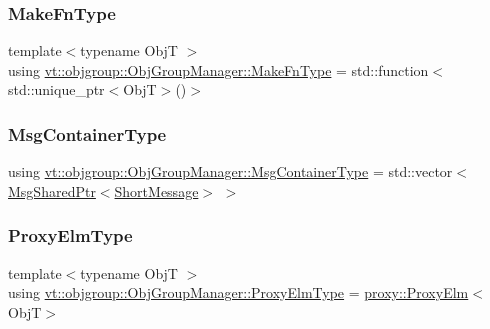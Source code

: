 \mbox{\label{structvt_1_1objgroup_1_1_obj_group_manager_a397d787b3876752a6d70511b2769b872}} 
\subsubsection{\texorpdfstring{Make\+Fn\+Type}{MakeFnType}}
{\footnotesize\ttfamily template$<$typename ObjT $>$ \\
using \hyperlink{structvt_1_1objgroup_1_1_obj_group_manager_a397d787b3876752a6d70511b2769b872}{vt\+::objgroup\+::\+Obj\+Group\+Manager\+::\+Make\+Fn\+Type} =  std\+::function$<$std\+::unique\+\_\+ptr$<$ObjT$>$()$>$}

\mbox{\label{structvt_1_1objgroup_1_1_obj_group_manager_ab89e17bd301b2aa684fce22f0b4af30a}} 
\subsubsection{\texorpdfstring{Msg\+Container\+Type}{MsgContainerType}}
{\footnotesize\ttfamily using \hyperlink{structvt_1_1objgroup_1_1_obj_group_manager_ab89e17bd301b2aa684fce22f0b4af30a}{vt\+::objgroup\+::\+Obj\+Group\+Manager\+::\+Msg\+Container\+Type} =  std\+::vector$<$\hyperlink{namespacevt_ab2b3d506ec8e8d1540aede826d84a239}{Msg\+Shared\+Ptr}$<$\hyperlink{namespacevt_a1125ac1da6c0bbf141e0ea0739d7602d}{Short\+Message}$>$ $>$}

\mbox{\label{structvt_1_1objgroup_1_1_obj_group_manager_adba6c8ecb0f4c30e719f1abb995cfc9b}} 
\subsubsection{\texorpdfstring{Proxy\+Elm\+Type}{ProxyElmType}}
{\footnotesize\ttfamily template$<$typename ObjT $>$ \\
using \hyperlink{structvt_1_1objgroup_1_1_obj_group_manager_adba6c8ecb0f4c30e719f1abb995cfc9b}{vt\+::objgroup\+::\+Obj\+Group\+Manager\+::\+Proxy\+Elm\+Type} =  \hyperlink{structvt_1_1objgroup_1_1proxy_1_1_proxy_elm}{proxy\+::\+Proxy\+Elm}$<$ObjT$>$}

